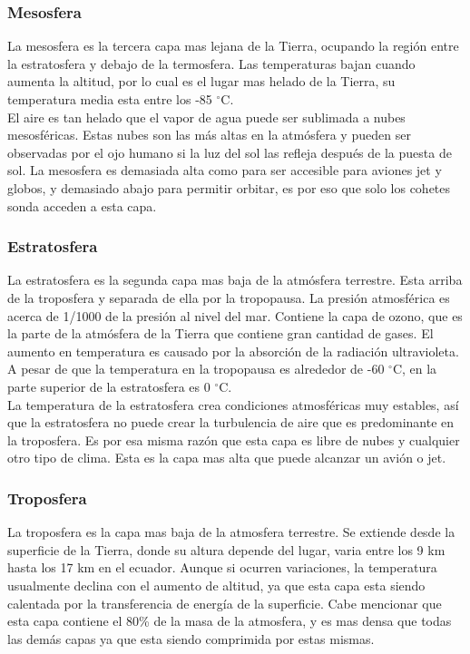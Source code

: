 \documentclass{article} %
\begin{document}
\subsubsection{Mesosfera}
La mesosfera es la tercera capa mas lejana de la Tierra, ocupando la región entre la estratosfera y debajo de la termosfera. Las temperaturas bajan cuando aumenta la altitud, por lo cual es el lugar mas helado de la Tierra, su temperatura media esta entre los -85 $^{\circ}$C. \\

El aire es tan helado que el vapor de agua puede ser sublimada a nubes mesosféricas. Estas nubes son las más altas en la atmósfera y pueden ser observadas por el ojo humano si la luz del sol las refleja después de la puesta de sol. La mesosfera es demasiada alta como para ser accesible para aviones jet y globos, y demasiado abajo para permitir orbitar, es por eso que solo los cohetes sonda acceden a esta capa.

\subsubsection{Estratosfera}
La estratosfera es la segunda capa mas baja de la atmósfera terrestre. Esta arriba de la troposfera y separada de ella por la tropopausa.  La presión atmosférica es acerca de 1/1000 de la presión al nivel del mar. Contiene la capa de ozono, que es la parte de la atmósfera de la Tierra que contiene gran cantidad de gases.  El aumento en temperatura es causado por la absorción de la radiación ultravioleta. A pesar de que la temperatura en la tropopausa es alrededor de -60 $^{\circ}$C, en la parte superior de la estratosfera es 0 $^{\circ}$C.\\

La temperatura de la estratosfera crea condiciones atmosféricas muy estables, así que la estratosfera no puede crear la turbulencia de aire que es predominante en la troposfera. Es por esa misma razón que esta capa es libre de nubes y cualquier otro tipo de clima. Esta es la capa mas alta que puede alcanzar un avión o jet.


\subsubsection{Troposfera}
La troposfera es la capa mas baja de la atmosfera terrestre. Se extiende desde la superficie de la Tierra, donde su altura depende del lugar, varia entre los 9 km hasta los 17 km en el ecuador. Aunque si ocurren variaciones, la temperatura usualmente declina con el aumento de altitud, ya que esta capa esta siendo calentada por la transferencia de energía de la superficie. Cabe mencionar que esta capa contiene el 80\% de la masa de la atmosfera, y es mas densa que todas las demás capas ya que esta siendo comprimida por estas mismas.\\
\end{document}
